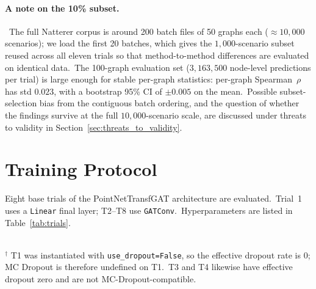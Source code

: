 \paragraph{A note on the 10\% subset.}\ The full Natterer corpus is around 200 batch files of 50 graphs each ($\approx 10{,}000$ scenarios); we load the first 20 batches, which gives the $1{,}000$-scenario subset reused across all eleven trials so that method-to-method differences are evaluated on identical data.\ The 100-graph evaluation set ($3{,}163{,}500$ node-level predictions per trial) is large enough for stable per-graph statistics: per-graph Spearman~$\rho$ has std $0.023$, with a bootstrap 95\% CI of $\pm 0.005$ on the mean.\ Possible subset-selection bias from the contiguous batch ordering, and the question of whether the findings survive at the full $10{,}000$-scenario scale, are discussed under threats to validity in Section~\ref{sec:threats_to_validity}.

\section{Training Protocol}\label{sec:training_protocol}

Eight base trials of the PointNetTransfGAT architecture are evaluated.\ Trial~1 uses a \texttt{Linear} final layer; T2--T8 use \texttt{GATConv}.\ Hyperparameters are listed in Table~\ref{tab:trials}.

\begin{table}[htbp]
 \centering
 \caption[Training trials and hyperparameters]{Training trials.\ T1 uses a Linear final layer; T2--T8 use GATConv.}
 \label{tab:trials}
 \\[2pt]
 \footnotesize $^\dagger$ T1 was instantiated with \texttt{use\_dropout=False}, so the effective dropout rate is $0$; MC Dropout is therefore undefined on T1.\ T3 and T4 likewise have effective dropout zero and are not MC-Dropout-compatible.
\end{table}


